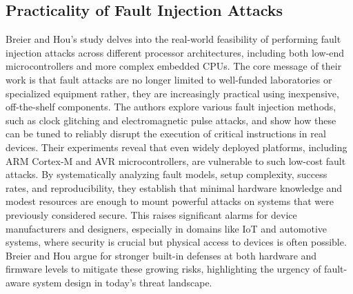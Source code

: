 \subsection*{Practicality of Fault Injection Attacks \cite{breier2022practical}}
Breier and Hou’s study delves into the real-world feasibility of performing fault injection attacks across different processor architectures, including both low-end microcontrollers and more complex embedded CPUs. The core message of their work is that fault attacks are no longer limited to well-funded laboratories or specialized equipment rather, they are increasingly practical using inexpensive, off-the-shelf components. The authors explore various fault injection methods, such as clock glitching and electromagnetic pulse attacks, and show how these can be tuned to reliably disrupt the execution of critical instructions in real devices. Their experiments reveal that even widely deployed platforms, including ARM Cortex-M and AVR microcontrollers, are vulnerable to such low-cost fault attacks. By systematically analyzing fault models, setup complexity, success rates, and reproducibility, they establish that minimal hardware knowledge and modest resources are enough to mount powerful attacks on systems that were previously considered secure. This raises significant alarms for device manufacturers and designers, especially in domains like IoT and automotive systems, where security is crucial but physical access to devices is often possible. Breier and Hou argue for stronger built-in defenses at both hardware and firmware levels to mitigate these growing risks, highlighting the urgency of fault-aware system design in today's threat landscape.

